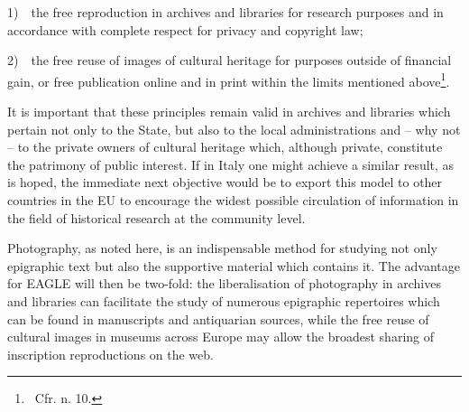 \documentclass[amsthm,ebook]{saparticle}
\begin{document}
\bigskip

1)\ \ the free reproduction in archives and libraries for research purposes and in accordance with complete respect for
privacy and copyright law;

2)\ \ the free reuse of images of cultural heritage for purposes outside of financial gain, or free publication online
and in print within the limits mentioned above\footnote{\ Cfr. n. 10.}.

It is important that these principles remain valid in archives and libraries which pertain not only to the State, but
also to the local administrations and – why not – to the private owners of cultural heritage which, although private,
constitute the patrimony of public interest. If in Italy one might achieve a similar result, as is hoped, the immediate
next objective would be to export this model to other countries in the EU to encourage the widest possible circulation
of information in the field of historical research at the community level.

Photography, as noted here, is an indispensable method for studying not only epigraphic text but also the supportive
material which contains it. The advantage for EAGLE will then be two-fold: the liberalisation of photography in
archives and libraries can facilitate the study of numerous epigraphic repertoires which can be found in manuscripts
and antiquarian sources, while the free reuse of cultural images in museums across Europe may allow the broadest
sharing of inscription reproductions on the web.




\end{document}
